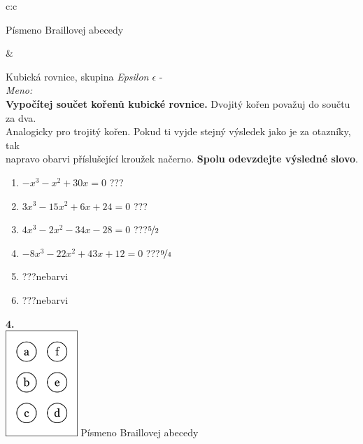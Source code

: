 \documentclass[10pt]{report}
\begin{document}
\begin{tabular}{c:c}
\begin{minipage}[c][99mm][t]{0.49\linewidth}
\begin{center}
\begin{minipage}{0.20\linewidth}
\begin{center}
{\small Písmeno Braillovej abecedy}
\end{center}
\end{minipage}
\end{center}
\end{minipage}
&
\begin{minipage}[c][99mm][t]{0.49\linewidth}
\begin{center}
\vspace{7mm}
{\huge Kubická rovnice, skupina \textit{Epsilon $\epsilon$} -}\\[4.5mm]
\textit{Meno:}\phantom{xxxxxxxxxxxxxxxxxxxxxxxxxxxxxxxxxxxxxxxxxxxxxxxxxxxxxxxxxxxxxxxxx}\\[3.5mm]
\textbf{Vypočítej součet kořenů kubické rovnice.} Dvojitý kořen považuj do součtu za dva.\\Analogicky pro trojitý kořen. Pokud ti vyjde stejný výsledek jako je za otazníky, tak\\napravo obarvi příslušející kroužek načerno. \textbf{Spolu odevzdejte výsledné slovo}.\\[3mm]
\begin{minipage}{0.77\linewidth}
\begin{center}
\begin{varwidth}{\textwidth}
\begin{enumerate}
\large
\item $-x^3-x^2+30x=0$\quad \dotfill\; ???\;\dotfill {}
\item $3x^3-15x^2+6x+24=0$\quad \dotfill\; ???\;\dotfill {}
\item $4x^3-2x^2-34x-28=0$\quad \dotfill\; ???\;\dotfill \quad $\nicefrac{5}{2}$
\item $-8x^3-22x^2+43x+12=0$\quad \dotfill\; ???\;\dotfill \quad $\nicefrac{9}{4}$
\item \quad \dotfill\; ???\;\dotfill \quad nebarvi
\item \quad \dotfill\; ???\;\dotfill \quad nebarvi
\end{enumerate}
\end{varwidth}
\end{center}
\end{minipage}
\begin{minipage}{0.20\linewidth}
\begin{center}
{\Huge\bfseries 4.} \\[2mm]
\includegraphics[height=40mm]{../images/braille.png}
{\small Písmeno Braillovej abecedy}
\end{center}
\end{minipage}
\end{center}
\end{minipage}

\end{tabular}
\end{document}
